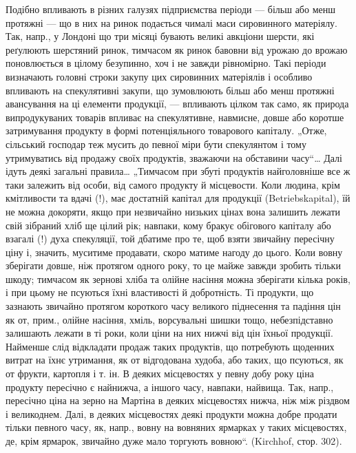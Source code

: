 Подібно впливають в різних галузях підприємства періоди — більш
або менш протяжні — що в них на ринок подається чималі маси сировинного
матеріялу. Так, напр., у Лондоні що три місяці бувають великі
авкціони шерсти, які реґулюють шерстяний ринок, тимчасом як ринок
бавовни від урожаю до врожаю поновлюється в цілому безупинно, хоч
і не завжди рівномірно. Такі періоди визначають головні строки закупу
цих сировинних матеріялів і особливо впливають на спекулятивні закупи,
що зумовлюють більш або менш протяжні авансування на ці елементи
продукції, — впливають цілком так само, як природа випродукуваних
товарів впливає на спекулятивне, навмисне, довше або коротше затримування
продукту в формі потенціяльного товарового капіталу. „Отже,
сільський господар теж мусить до певної міри бути спекулянтом і тому
утримуватись від продажу своїх продуктів, зважаючи на обставини часу“\dots{}
Далі ідуть деякі загальні правила\dots{} „Тимчасом при збуті продуктів найголовніше
все ж таки залежить від особи, від самого продукту й місцевости.
Коли людина, крім кмітливости та вдачі (!), має достатній капітал для продукції
(Betriebskapital), їй не можна докоряти, якщо при незвичайно низьких цінах
вона залишить лежати свій зібраний хліб ще цілий рік; навпаки, кому
бракує обігового капіталу або взагалі (!) духа спекуляції, той дбатиме
про те, щоб взяти звичайну пересічну ціну і, значить, муситиме продавати,
скоро матиме нагоду до цього. Коли вовну зберігати довше, ніж протягом
одного року, то це майже завжди зробить тільки шкоду; тимчасом як
зернові хліба та олійне насіння можна зберігати кілька років, і при цьому
не псуються їхні властивості й добротність. Ті продукти, що зазнають
звичайно протягом короткого часу великого піднесення та падіння цін як
от, прим., олійне насіння, хміль, ворсувальні шишки тощо, небезпідставно
залишають лежати в ті роки, коли ціни на них нижчі від цін їхньої продукції.
Найменше слід відкладати продаж таких продуктів, що потребують
щоденних витрат на їхнє утримання, як от відгодована худоба, або таких,
що псуються, як от фрукти, картопля і т. ін. В деяких місцевостях у певну
добу року ціна продукту пересічно є найнижча, а іншого часу, навпаки,
найвища. Так, напр., пересічно ціна на зерно на Мартіна в деяких місцевостях
нижча, ніж між різдвом і великоднем. Далі, в деяких місцевостях
деякі продукти можна добре продати тільки певного часу, як, напр.,
вовну на вовняних ярмарках у таких місцевостях, де, крім ярмарок, звичайно
дуже мало торгують вовною“. (Kirchhof, стор. 302).

